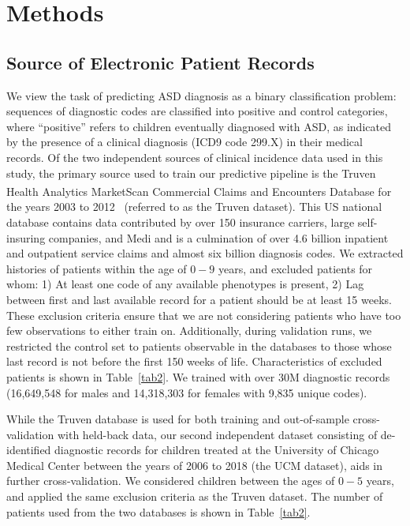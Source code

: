 \documentclass[3p,super,numbers,sort&compress,preprint,10pt]{elsarticle}
\begin{document}
\section*{Methods}
\subsection*{Source of Electronic Patient Records}

We view the task of predicting  ASD diagnosis   as a binary classification problem: sequences of diagnostic codes are classified into positive and control categories, where ``positive'' refers to children eventually diagnosed with ASD, as indicated by the presence of a clinical diagnosis (ICD9 code 299.X) in their medical records. Of the two independent sources of clinical incidence data used in this study,  the primary source used to train our predictive pipeline  is the Truven Health Analytics MarketScan\textsuperscript{\textregistered} Commercial Claims and Encounters Database for the years 2003 to 2012~\cite{hansen2017truven} (referred to  as the Truven dataset). This US national database contains data contributed by over 150 insurance carriers, large self-insuring companies, and Medi and is a culmination of over  4.6 billion inpatient and outpatient service claims and  almost six billion diagnosis codes. We extracted histories of patients within the age of $0-9$ years, and excluded  patients for whom:  1) At least one code of any available phenotypes is present, 2) Lag between first and last available record for a patient should be at least 15 weeks. These exclusion criteria ensure that we are not considering patients who have too few observations to either train on. Additionally, during validation runs,  we restricted the control set to patients observable in the databases to those whose last record is not before the first 150 weeks of life. Characteristics of excluded patients is shown in Table~\ref{tab2}. We trained with over  30M diagnostic records (16,649,548 for males and  14,318,303  for females with 9,835 unique  codes).

While the Truven database is used for both training and out-of-sample cross-validation with held-back  data, our second independent dataset  consisting of de-identified diagnostic records for children treated at the University of Chicago Medical Center between the years of 2006 to 2018 (the UCM dataset), aids in further cross-validation. We considered children between the ages of $0-5$ years, and  applied the same exclusion criteria as the Truven dataset.  The  number of  patients used from the two databases is shown in Table~\ref{tab2}.
\end{document}
